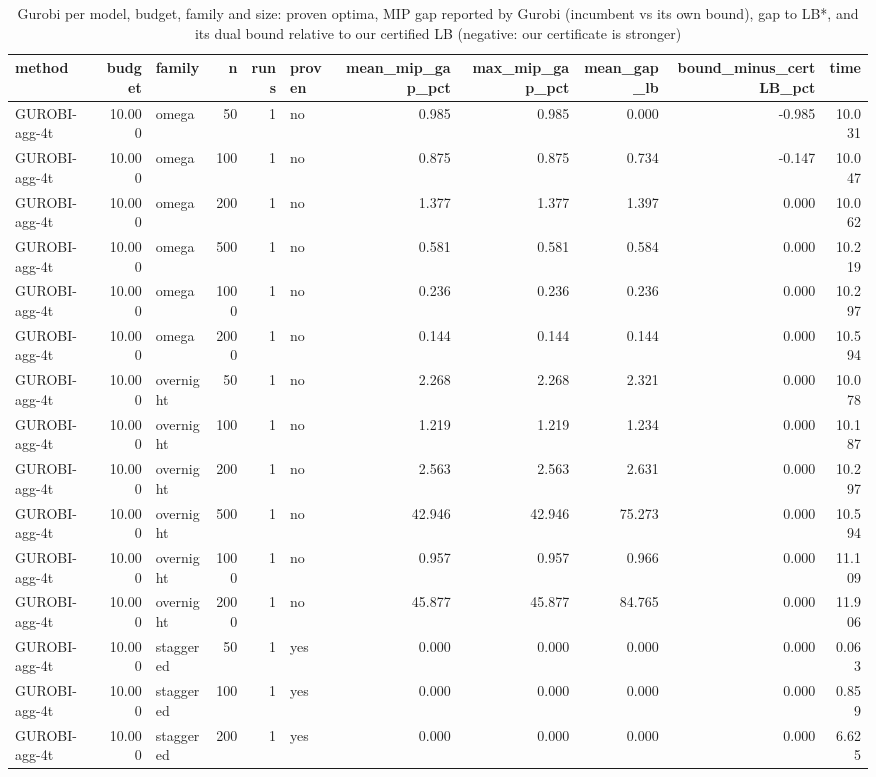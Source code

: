 \begin{table}[htbp]
\centering
\small
\caption{Gurobi per model, budget, family and size: proven optima, MIP gap reported by Gurobi (incumbent vs its own bound), gap to LB*, and its dual bound relative to our certified LB (negative: our certificate is stronger)}
\label{tab:E7_gurobi_threads_gurobi}
\begin{tabular}{lrlrrlrrrrr}
\toprule
method & budget & family & n & runs & proven & mean\_mip\_gap\_pct & max\_mip\_gap\_pct & mean\_gap\_lb & bound\_minus\_certLB\_pct & time \\
\midrule
GUROBI-agg-4t & 10.000 & omega & 50 & 1 & no & 0.985 & 0.985 & 0.000 & -0.985 & 10.031 \\
GUROBI-agg-4t & 10.000 & omega & 100 & 1 & no & 0.875 & 0.875 & 0.734 & -0.147 & 10.047 \\
GUROBI-agg-4t & 10.000 & omega & 200 & 1 & no & 1.377 & 1.377 & 1.397 & 0.000 & 10.062 \\
GUROBI-agg-4t & 10.000 & omega & 500 & 1 & no & 0.581 & 0.581 & 0.584 & 0.000 & 10.219 \\
GUROBI-agg-4t & 10.000 & omega & 1000 & 1 & no & 0.236 & 0.236 & 0.236 & 0.000 & 10.297 \\
GUROBI-agg-4t & 10.000 & omega & 2000 & 1 & no & 0.144 & 0.144 & 0.144 & 0.000 & 10.594 \\
GUROBI-agg-4t & 10.000 & overnight & 50 & 1 & no & 2.268 & 2.268 & 2.321 & 0.000 & 10.078 \\
GUROBI-agg-4t & 10.000 & overnight & 100 & 1 & no & 1.219 & 1.219 & 1.234 & 0.000 & 10.187 \\
GUROBI-agg-4t & 10.000 & overnight & 200 & 1 & no & 2.563 & 2.563 & 2.631 & 0.000 & 10.297 \\
GUROBI-agg-4t & 10.000 & overnight & 500 & 1 & no & 42.946 & 42.946 & 75.273 & 0.000 & 10.594 \\
GUROBI-agg-4t & 10.000 & overnight & 1000 & 1 & no & 0.957 & 0.957 & 0.966 & 0.000 & 11.109 \\
GUROBI-agg-4t & 10.000 & overnight & 2000 & 1 & no & 45.877 & 45.877 & 84.765 & 0.000 & 11.906 \\
GUROBI-agg-4t & 10.000 & staggered & 50 & 1 & yes & 0.000 & 0.000 & 0.000 & 0.000 & 0.063 \\
GUROBI-agg-4t & 10.000 & staggered & 100 & 1 & yes & 0.000 & 0.000 & 0.000 & 0.000 & 0.859 \\
GUROBI-agg-4t & 10.000 & staggered & 200 & 1 & yes & 0.000 & 0.000 & 0.000 & 0.000 & 6.625 \\

\end{tabular}
\end{table}
